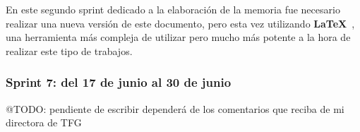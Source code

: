 En este segundo sprint dedicado a la elaboración de la memoria fue necesario realizar una nueva versión de este
documento, pero esta vez utilizando \textbf{LaTeX}~\cite{url_latex}, una herramienta más compleja
de utilizar pero mucho más potente a la hora de realizar este tipo de trabajos.

\subsubsection{Sprint 7: del 17 de junio al 30 de junio}

\colorbox{color_highlight}{@TODO: pendiente de escribir dependerá de los comentarios que reciba de mi directora de TFG}
